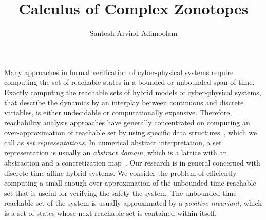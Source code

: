 \documentclass[11pt,a4paper,twoside,openright]{article}
\title{Calculus of Complex Zonotopes}
\author{Santosh Arvind Adimoolam}
\date{}
\begin{document}
\maketitle Many approaches in formal verification of cyber-physical
systems require computing the set of reachable states in a bounded or
unbounded span of time. Exactly computing the reachable sets of hybrid
models of cyber-physical systems, that describe the dynamics by an
interplay between continuous and discrete variables, is either
undecidable or computationally expensive.  Therefore, reachability
analysis approaches have generally concentrated on computing an
over-approximation of reachable set by using specific data
structures~\cite{cousot1978automatic,Sankaranarayanan+Dang+Ivancic-08-Symbolic,kvasnica2004multi,DBLP:journals/tecs/AllamigeonGSGP16,kurzhanskiy2006ellipsoidal,DBLP:conf/esop/AdjeGG10,prajna2004safety},
which we call as {\it set representations}.  In numerical abstract
interpretation, a set representation is usually an {\it abstract
  domain}, which is a lattice with an abstraction and a concretization
map~\cite{jeannet2009apron}.  Our research is in general concerned
with discrete time affine hybrid systems.  We consider the problem of
efficiently computing a small enough over-approximation of the
unbounded time reachable set that is useful for verifying the safety
the system.  The unbounded time reachable set of the system is usually
approximated by a {\it positive invariant}, which is a set of states
whose next reachable set is contained within itself.
\end{document}

